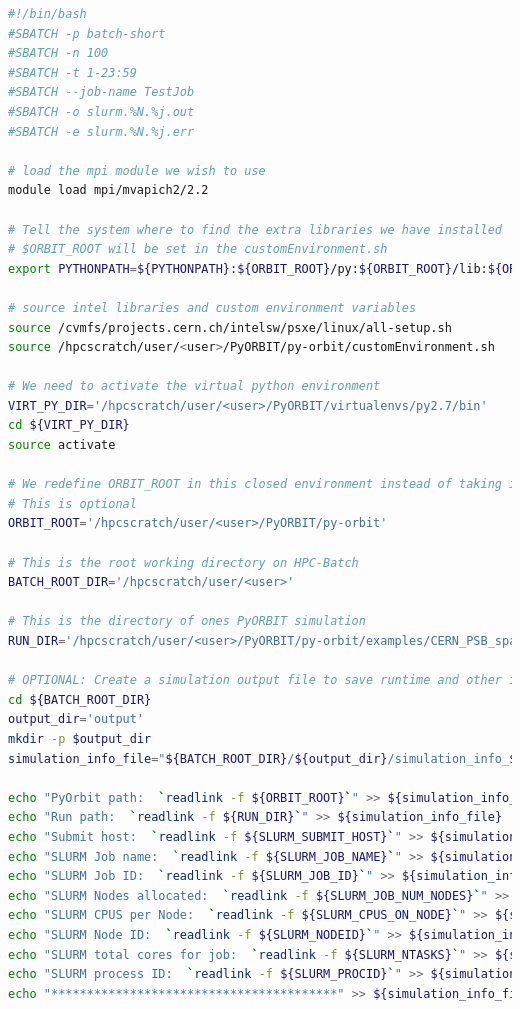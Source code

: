 \documentclass[a4paper]{cernatsnote}
\begin{document}
\begin{lstlisting}[language=bash, belowskip=-3\medskipamount]
#!/bin/bash
#SBATCH -p batch-short
#SBATCH -n 100
#SBATCH -t 1-23:59
#SBATCH --job-name TestJob
#SBATCH -o slurm.%N.%j.out
#SBATCH -e slurm.%N.%j.err

# load the mpi module we wish to use
module load mpi/mvapich2/2.2

# Tell the system where to find the extra libraries we have installed
# $ORBIT_ROOT will be set in the customEnvironment.sh
export PYTHONPATH=${PYTHONPATH}:${ORBIT_ROOT}/py:${ORBIT_ROOT}/lib:${ORBIT_ROOT}/virtualenvs/py2.7/lib/python2.7/site-packages/

# source intel libraries and custom environment variables
source /cvmfs/projects.cern.ch/intelsw/psxe/linux/all-setup.sh
source /hpcscratch/user/<user>/PyORBIT/py-orbit/customEnvironment.sh

# We need to activate the virtual python environment
VIRT_PY_DIR='/hpcscratch/user/<user>/PyORBIT/virtualenvs/py2.7/bin'
cd ${VIRT_PY_DIR}
source activate

# We redefine ORBIT_ROOT in this closed environment instead of taking it from the system
# This is optional
ORBIT_ROOT='/hpcscratch/user/<user>/PyORBIT/py-orbit'

# This is the root working directory on HPC-Batch
BATCH_ROOT_DIR='/hpcscratch/user/<user>'

# This is the directory of ones PyORBIT simulation
RUN_DIR='/hpcscratch/user/<user>/PyORBIT/py-orbit/examples/CERN_PSB_spacecharge'

# OPTIONAL: Create a simulation output file to save runtime and other info
cd ${BATCH_ROOT_DIR}
output_dir='output'
mkdir -p $output_dir
simulation_info_file="${BATCH_ROOT_DIR}/${output_dir}/simulation_info_${SLURM_JOB_ID}.${SLURM_NODEID}.${SLURM_PROCID}.txt"

echo "PyOrbit path:  `readlink -f ${ORBIT_ROOT}`" >> ${simulation_info_file}
echo "Run path:  `readlink -f ${RUN_DIR}`" >> ${simulation_info_file}
echo "Submit host:  `readlink -f ${SLURM_SUBMIT_HOST}`" >> ${simulation_info_file}
echo "SLURM Job name:  `readlink -f ${SLURM_JOB_NAME}`" >> ${simulation_info_file}
echo "SLURM Job ID:  `readlink -f ${SLURM_JOB_ID}`" >> ${simulation_info_file}
echo "SLURM Nodes allocated:  `readlink -f ${SLURM_JOB_NUM_NODES}`" >> ${simulation_info_file}
echo "SLURM CPUS per Node:  `readlink -f ${SLURM_CPUS_ON_NODE}`" >> ${simulation_info_file}
echo "SLURM Node ID:  `readlink -f ${SLURM_NODEID}`" >> ${simulation_info_file}
echo "SLURM total cores for job:  `readlink -f ${SLURM_NTASKS}`" >> ${simulation_info_file}
echo "SLURM process ID:  `readlink -f ${SLURM_PROCID}`" >> ${simulation_info_file}
echo "****************************************" >> ${simulation_info_file}


\end{lstlisting}
\end{document}

